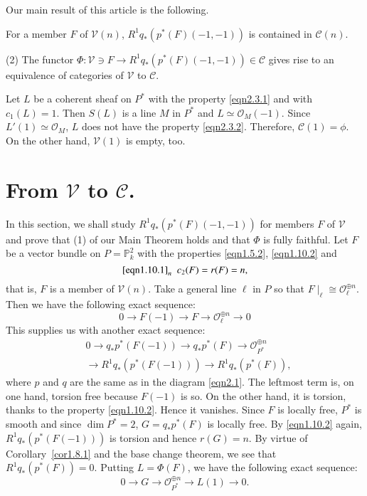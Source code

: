 Our main result of this article is the following.

\begin{MT}\label{MT2.16}
For a member $F$ of $\mathscr{V}(n)$,
$R^{1}q_{\ast}(p^{\ast}(F)(-1,-1))$ is contained in $\mathscr{C}(n)$.

(2) The functor $\Phi:\mathscr{V}\ni F\to
R^{1}q_{\ast}(p^{\ast}(F)(-1,-1))\in \mathscr{C}$ gives rise to an
equivalence of categories of $\mathscr{V}$ to $\mathscr{C}$. 
\end{MT}

\begin{EXP}\label{EXP2.17}
Let $L$ be a coherent sheaf on $P^{\ast}$ with the property
\eqref{eqn2.3.1} and with $c_1(L)=1$. Then $S(L)$ is a line $M$ in
$P^{\ast}$ and $L\simeq \mathscr{O}_M(-1)$. Since $L'(1)\simeq
\mathscr{O}_M$, $L$ does not have the property
\eqref{eqn2.3.2}. Therefore, $\mathscr{C}(1)=\phi$. On the other hand,
$\mathscr{V}(1)$ is empty, too.
\end{EXP}

\section{From \texorpdfstring{$\mathscr{V}$}{eq} to \texorpdfstring{$\mathscr{C}$}{eq}.}\label{s3}

In this section, we shall study $R^{1}q_{\ast}(p^{\ast}(F)(-1,-1))$
for members $F$ of $\mathscr{V}$ and prove that (1) of our Main
Theorem holds and that $\Phi$ is fully faithful. Let $F$ be a vector
bundle on $P=\mathbb{P}^{2}_k$ with the properties \eqref{eqn1.5.2},
\eqref{eqn1.10.2} and 
$$
\eqref{eqn1.10.1}_{n} \ \ c_2(F)=r(F)=n, 
$$
that is, $F$ is a member of $\mathscr{V}(n)$. Take a general line
$\ell$ in $P$ so that\pageoriginale 
$F\mid_{\ell}\cong \mathscr{O}_{\ell}^{\oplus
  n}$. Then we have the following exact sequence: 
$$
0\to F(-1)\to F\to \mathscr{O}_{\ell}^{\oplus n}\to 0
$$
This supplies us with another exact sequence: 
$$
\begin{aligned}
&0\to q_{\ast}p^{\ast}(F(-1))\to q_{\ast}p^{\ast}(F)\to
\mathscr{O}_{P^{\ast}}^{\oplus n} \\
&{}\to R^{1}q_{\ast}(p^{\ast}(F(-1)))\to R^{1}q_{\ast}(p^{\ast}(F)), 
\end{aligned}
$$
where $p$ and $q$ are the same as in the diagram \eqref{eqn2.1}. The
leftmost term is, on one hand, torsion free because $F(-1)$ is so. On
the other hand, it is torsion, thanks to the property
\eqref{eqn1.10.2}. Hence it vanishes. Since $F$ is locally free,
$P^{\ast}$ is smooth and since $\dim P^{\ast}=2$,
$G=q_{\ast}p^{\ast}(F)$ is locally free. By \eqref{eqn1.10.2} again,
$R^{1}q_{\ast}(p^{\ast}(F(-1)))$ is torsion and hence $r(G)=n$. By
virtue of Corollary~\ref{cor1.8.1} and the base change theorem, we see
that $R^{1}q_{\ast}(p^{\ast}(F))=0$. Putting $L=\Phi(F)$, we have the
following exact sequence: 
$$
0\to G\to \mathscr{O}^{\oplus n}_{P^{\ast}}\to L(1)\to 0.
$$

